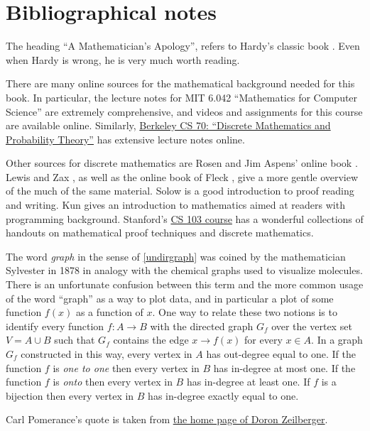 \section{Bibliographical notes}\label{notesmathchap}

The heading ``A Mathematician's Apology'', refers to Hardy's classic
book \cite{Hardy41}. Even when Hardy is wrong, he is very much worth
reading.

There are many online sources for the mathematical background needed for
this book. In particular, the lecture notes for MIT 6.042 ``Mathematics
for Computer Science'' \cite{LehmanLeightonMeyer} are extremely
comprehensive, and videos and assignments for this course are available
online. Similarly, \href{http://www.eecs70.org/}{Berkeley CS 70:
``Discrete Mathematics and Probability Theory''} has extensive lecture
notes online.

Other sources for discrete mathematics are Rosen \cite{Rosen19discrete}
and Jim Aspens' online book \cite{AspensDiscreteMath}. Lewis and Zax
\cite{LewisZax19}, as well as the online book of Fleck \cite{Fleck},
give a more gentle overview of the much of the same material. Solow
\cite{Solow14} is a good introduction to proof reading and writing. Kun
\cite{Kun18} gives an introduction to mathematics aimed at readers with
programming background. Stanford's \href{https://cs103.stanford.edu}{CS
103 course} has a wonderful collections of handouts on mathematical
proof techniques and discrete mathematics.

The word \emph{graph} in the sense of \cref{undirgraph} was coined by
the mathematician Sylvester in 1878 in analogy with the chemical graphs
used to visualize molecules. There is an unfortunate confusion between
this term and the more common usage of the word ``graph'' as a way to
plot data, and in particular a plot of some function \(f(x)\) as a
function of \(x\). One way to relate these two notions is to identify
every function \(f:A \rightarrow B\) with the directed graph \(G_f\)
over the vertex set \(V= A \cup B\) such that \(G_f\) contains the edge
\(x \rightarrow f(x)\) for every \(x\in A\). In a graph \(G_f\)
constructed in this way, every vertex in \(A\) has out-degree equal to
one. If the function \(f\) is \emph{one to one} then every vertex in
\(B\) has in-degree at most one. If the function \(f\) is \emph{onto}
then every vertex in \(B\) has in-degree at least one. If \(f\) is a
bijection then every vertex in \(B\) has in-degree exactly equal to one.

Carl Pomerance's quote is taken from
\href{http://sites.math.rutgers.edu/~zeilberg/quotes.html}{the home page
of Doron Zeilberger}.
